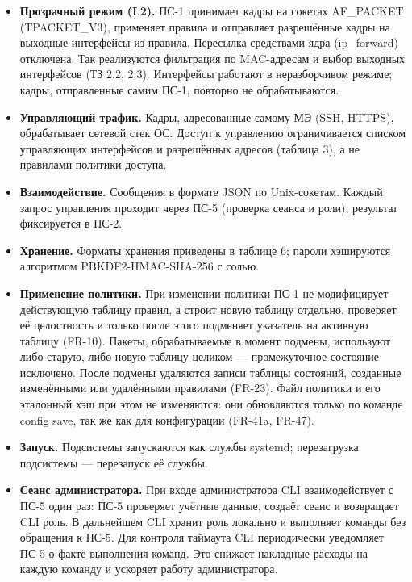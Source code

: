 \documentclass[13pt,a4paper,final]{article}
\begin{document}
	\begin{itemize}
		\item \textbf{Прозрачный режим (L2).} ПС-1 принимает кадры на сокетах AF\_PACKET (TPACKET\_V3), применяет правила и отправляет разрешённые кадры на выходные интерфейсы из правила. Пересылка средствами ядра (ip\_forward) отключена. Так реализуются фильтрация по MAC-адресам и выбор выходных интерфейсов (ТЗ 2.2, 2.3). Интерфейсы работают в неразборчивом режиме; кадры, отправленные самим ПС-1, повторно не обрабатываются.
		
		\item \textbf{Управляющий трафик.} Кадры, адресованные самому МЭ (SSH, HTTPS), обрабатывает сетевой стек ОС. Доступ к управлению ограничивается списком управляющих интерфейсов и разрешённых адресов (таблица 3), а не правилами политики доступа.
		
		\item \textbf{Взаимодействие.} Сообщения в формате JSON по Unix-сокетам. Каждый запрос управления проходит через ПС-5 (проверка сеанса и роли), результат фиксируется в ПС-2.
		
		\item \textbf{Хранение.} Форматы хранения приведены в таблице 6; пароли хэшируются алгоритмом PBKDF2-HMAC-SHA-256 с солью.
		
		\item \textbf{Применение политики.} При изменении политики ПС-1 не модифицирует действующую таблицу правил, а строит новую таблицу отдельно, проверяет её целостность и только после этого  подменяет указатель на активную таблицу (FR-10). Пакеты, обрабатываемые в момент подмены, используют либо старую, либо новую таблицу целиком — промежуточное состояние исключено. После подмены удаляются записи таблицы состояний, созданные изменёнными или удалёнными правилами (FR-23). \textcolor{edit}{Файл политики и его эталонный хэш при этом не изменяются: они обновляются только по команде config save, так же как для конфигурации (FR-41a, FR-47).}
		
		\item \textbf{Запуск.} Подсистемы запускаются как службы systemd; перезагрузка подсистемы — перезапуск её службы.
		
		\item \textbf{Сеанс администратора.} При входе администратора CLI взаимодействует с ПС-5 один раз: ПС-5 проверяет учётные данные, создаёт сеанс и возвращает CLI роль. В дальнейшем CLI хранит роль локально и выполняет команды без обращения к ПС-5. Для контроля таймаута CLI периодически уведомляет ПС-5 о факте выполнения команд. Это снижает накладные расходы на каждую команду и ускоряет работу администратора.
		

\end{itemize}
\end{document}

